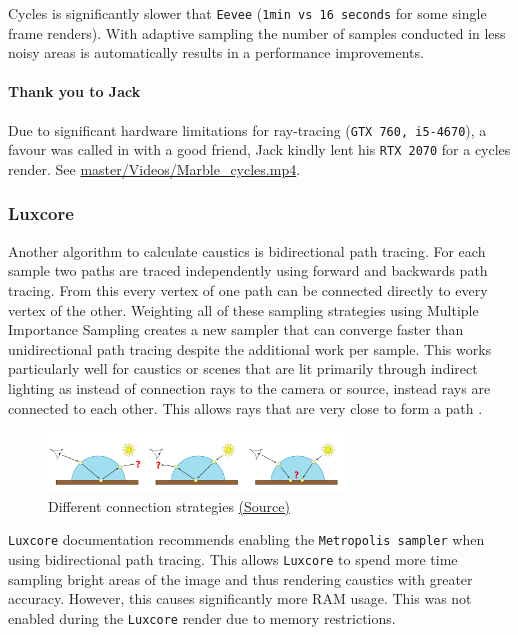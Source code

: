 \documentclass[11pt]{article}
\begin{document}
Cycles is significantly slower that \texttt{Eevee} (\texttt{1min vs 16 seconds} for some single
frame renders). With adaptive sampling the number of samples conducted in less
noisy areas is automatically results in a performance improvements.
\paragraph{Thank you to Jack}
\label{sec:orgf00f775}
Due to significant hardware limitations for ray-tracing (\texttt{GTX 760, i5-4670}), a
favour was called in with a good friend, Jack kindly lent his \texttt{RTX 2070}  for a
cycles render. See \href{https://github.com/Jake-Moss/blender-chess/blob/master/Videos/Marble\_cycles.mp4}{master/Videos/Marble\_cycles.mp4}.
\subsubsection{Luxcore}
\label{sec:org58a3ee8}
Another algorithm to calculate caustics is bidirectional path tracing. For each
sample two paths are traced independently using forward and backwards path tracing.
From this every vertex of one path can be connected directly to every vertex of
the other. Weighting all of these sampling strategies using Multiple Importance
Sampling creates a new sampler that can converge faster than unidirectional path
tracing despite the additional work per sample. This works particularly well for
caustics or scenes that are lit primarily through indirect lighting as instead
of connection rays to the camera or source, instead rays are connected to
each other. This allows rays that are very close to form a path \cite{Caustic-Connection}.

\begin{figure}[htbp]
\centering
\includegraphics[width=0.7\textwidth]{Images/bidirectional diagram.png}
\caption{\label{bidirectional}Different connection strategies \href{https://graphics.pixar.com/library/CausticConnections/paper.pdf}{(Source)}}
\end{figure}

\texttt{Luxcore} documentation recommends enabling the \texttt{Metropolis sampler} when using
bidirectional path tracing. This allows \texttt{Luxcore} to spend more time sampling
bright areas of the image and thus rendering caustics with greater accuracy.
However, this causes significantly more RAM usage. This was not enabled during
the \texttt{Luxcore} render due to memory restrictions.\\
\end{document}
